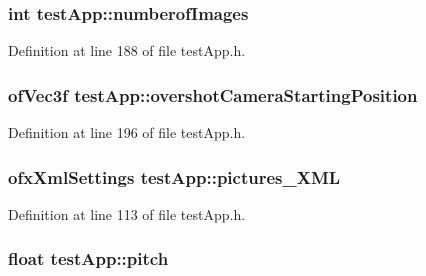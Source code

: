 \hypertarget{classtest_app_a957cf7fdb3ea964a88ca1be13e4d68fc}{
\subsubsection[{numberof\-Images}]{\setlength{\rightskip}{0pt plus 5cm}int test\-App\-::numberof\-Images}}\label{classtest_app_a957cf7fdb3ea964a88ca1be13e4d68fc}


Definition at line 188 of file test\-App.\-h.

\hypertarget{classtest_app_a846feea7c2c4d4b1929bb72c546b3e19}{
\subsubsection[{overshot\-Camera\-Starting\-Position}]{\setlength{\rightskip}{0pt plus 5cm}of\-Vec3f test\-App\-::overshot\-Camera\-Starting\-Position}}\label{classtest_app_a846feea7c2c4d4b1929bb72c546b3e19}


Definition at line 196 of file test\-App.\-h.

\hypertarget{classtest_app_a85133f49103cfa002f39d882f7168236}{
\subsubsection[{pictures\-\_\-\-X\-M\-L}]{\setlength{\rightskip}{0pt plus 5cm}ofx\-Xml\-Settings test\-App\-::pictures\-\_\-\-X\-M\-L}}\label{classtest_app_a85133f49103cfa002f39d882f7168236}


Definition at line 113 of file test\-App.\-h.

\hypertarget{classtest_app_aabbebeb113838374f659e86a0355b260}{
\subsubsection[{pitch}]{\setlength{\rightskip}{0pt plus 5cm}float test\-App\-::pitch}}\label{classtest_app_aabbebeb113838374f659e86a0355b260}


